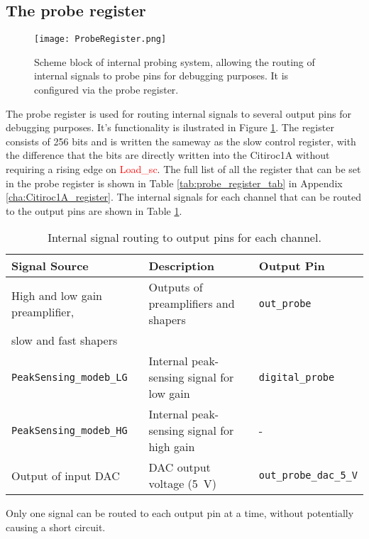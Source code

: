 \subsection{The probe register}
\begin{figure}[H]
    \centering
    \texttt{[image: ProbeRegister.png]}
    \caption{Scheme block of internal probing system, allowing the routing of internal signals to probe pins for debugging purposes. It is configured via the probe register. \autocite{datasheetCITIROC}}
    \label{fig:CITIROC1A_proberegiseter}
\end{figure}
The probe register is used for routing internal signals to several output pins for debugging purposes.
It's functionality is ilustrated in Figure \ref{fig:CITIROC1A_proberegiseter}.
The register consists of 256 bits and is written the sameway as the slow control register,
 with the difference that the bits are directly written into the Citiroc1A without requiring a rising edge on \textcolor{red}{Load\_sc}.\autocite{datasheetCITIROC}
\newline
 The full list of all the register that can be set in the probe register is shown in Table \ref{tab:probe_register_tab} in Appendix \ref{cha:Citiroc1A_register}.
\newline
The internal signals for each channel that can be routed to the output pins are shown in Table \ref{tab:probe_register}. 
 \begin{table}[h]
    \centering
    \begin{tabular}{@{}lll@{}}
    \toprule
    \textbf{Signal Source} & \textbf{Description}                   & \textbf{Output Pin}        \\ \midrule
    High and low gain preamplifier, & Outputs of preamplifiers and shapers & \texttt{out\_probe}        \\
    slow and fast shapers                                                   &                          \\ \midrule
    \texttt{PeakSensing\_modeb\_LG} & Internal peak-sensing signal for low gain & \texttt{digital\_probe}    \\
    \texttt{PeakSensing\_modeb\_HG} & Internal peak-sensing signal for high gain & -    \\ \midrule
    Output of input DAC            & DAC output voltage (\SI{5}{\volt})  & \texttt{out\_probe\_dac\_5\_V} \\ \bottomrule
    \end{tabular}
    \caption{Internal signal routing to output pins for each channel.}
    \label{tab:probe_register}
\end{table}
\newline
Only one signal can be routed to each output pin at a time, without potentially causing a short circuit.\autocite{datasheetCITIROC}









 

